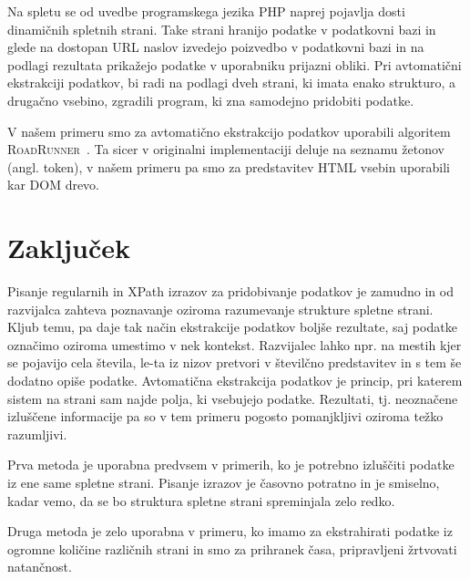 \documentclass[conference]{IEEEtran}
\begin{document}
	Na spletu se od uvedbe programskega jezika PHP naprej pojavlja dosti dinamičnih spletnih strani. Take strani hranijo podatke v podatkovni bazi in glede na dostopan URL naslov izvedejo poizvedbo v podatkovni bazi in na podlagi rezultata prikažejo podatke v uporabniku prijazni obliki. Pri avtomatični ekstrakciji podatkov, bi radi na podlagi dveh strani, ki imata enako strukturo, a drugačno vsebino, zgradili program, ki zna samodejno pridobiti podatke.
	
	V našem primeru smo za avtomatično ekstrakcijo podatkov uporabili algoritem \textsc{RoadRunner}~\cite{roadrunner, crescenzi2001automatic}. Ta sicer v originalni implementaciji deluje na seznamu žetonov (angl. token), v našem primeru pa smo za predstavitev HTML vsebin uporabili kar DOM drevo.
	
	\section{Zaključek}
	
	Pisanje regularnih in XPath izrazov za pridobivanje podatkov je zamudno in od razvijalca zahteva poznavanje oziroma razumevanje strukture spletne strani. Kljub temu, pa daje tak način ekstrakcije podatkov boljše rezultate, saj podatke označimo oziroma umestimo v nek kontekst. Razvijalec lahko npr. na mestih kjer se pojavijo cela števila, le-ta iz nizov pretvori v številčno predstavitev in s tem še dodatno opiše podatke. Avtomatična ekstrakcija podatkov je princip, pri katerem sistem na strani sam najde polja, ki vsebujejo podatke. Rezultati, tj. neoznačene izluščene informacije pa so v tem primeru pogosto pomanjkljivi oziroma težko razumljivi.
	
	Prva metoda je uporabna predvsem v primerih, ko je potrebno izluščiti podatke iz ene same spletne strani. Pisanje izrazov je časovno potratno in je smiselno, kadar vemo, da se bo struktura spletne strani spreminjala zelo redko.
	
	Druga metoda je zelo uporabna v primeru, ko imamo za ekstrahirati podatke iz ogromne količine različnih strani in smo za prihranek časa, pripravljeni žrtvovati natančnost.
	
	
	
	
\end{document}
